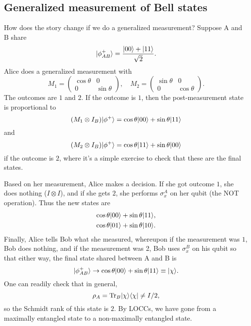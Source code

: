 \subsection*{Generalized measurement of Bell states} How does the story change if we do a generalized measurement? Suppose A and B share
\begin{equation*}
    \lvert\phi^+_{AB}\rangle = \frac{\lvert00\rangle+ \lvert11\rangle}{\sqrt{2}}.
\end{equation*}
Alice does a generalized measurement with
\begin{equation}
    M_1 = \begin{pmatrix}\cos\theta & 0\\
    0&\sin\theta\end{pmatrix}, \quad M_2 = \begin{pmatrix}\sin\theta & 0\\
    0&\cos\theta\end{pmatrix}.
\end{equation}
The outcomes are $1$ and $2$. If the outcome is $1$, then the post-measurement state is proportional to
\begin{equation*}
    (M_1\otimes I_B) \lvert\phi^+\rangle=\cos\theta\lvert00\rangle + \sin\theta\lvert11\rangle
\end{equation*}
and
\begin{equation*}
    (M_2\otimes I_B) \lvert\phi^+\rangle=\cos\theta\lvert11\rangle + \sin\theta\lvert00\rangle
\end{equation*}
if the outcome is $2$, where it's a simple exercise to check that these are the final states.

Based on her measurement, Alice makes a decision. If she got outcome $1$, she does nothing ($I\otimes I$), and if she gets $2$, she performs $\sigma_x^A$ on her qubit (the NOT operation). Thus the new states are
\begin{gather*}
    \cos\theta \lvert00\rangle+\sin\theta\lvert11\rangle,\\
    \cos\theta \lvert01\rangle + \sin\theta\lvert10\rangle.
\end{gather*}
Finally, Alice tells Bob what she measured, whereupon if the measurement was $1$, Bob does nothing, and if the measurement was 2, Bob uses $\sigma_x^B$ on his qubit so that either way, the final state shared between A and B is
\begin{equation}
    \lvert\phi_{AB}^+\rangle \to \cos\theta \lvert00\rangle + \sin\theta\lvert11\rangle \equiv \lvert\chi\rangle.
\end{equation}
One can readily check that in general,
\begin{equation}
    \rho_A=\operatorname{Tr}_B \lvert\chi\rangle\langle\chi\rvert \neq I/2,
\end{equation}
so the Schmidt rank of this state is $2$. By LOCCs, we have gone from a maximally entangled state to a non-maximally entangled state.

